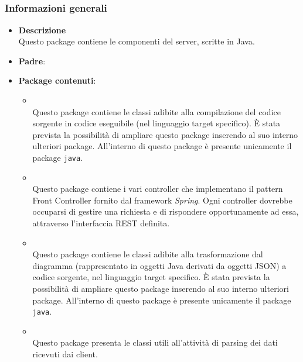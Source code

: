 \subsection{}
\label{\nogloxy{swedesigner::server}}
\subsubsection{Informazioni generali}
\begin{itemize}
\item \textbf{Descrizione}\\
Questo package contiene le componenti del server, scritte in Java.
\item \textbf{Padre}: \hyperref[\nogloxy{swedesigner}]{}
\item \textbf{Package contenuti}:
\begin{itemize}
\item \hyperref[\nogloxy{swedesigner::server::compiler}]{}\\
Questo package contiene le classi adibite alla compilazione del codice sorgente in codice eseguibile (nel linguaggio target specifico). È stata prevista la possibilità di ampliare questo package inserendo al suo interno ulteriori package. All'interno di questo package è presente unicamente il package \texttt{java}.
\item \hyperref[\nogloxy{swedesigner::server::controller}]{}\\
Questo package contiene i vari controller che implementano il pattern Front Controller fornito dal framework \emph{Spring}. Ogni controller dovrebbe occuparsi di gestire una richiesta e di rispondere opportunamente ad essa, attraverso l'interfaccia REST definita.
\item \hyperref[\nogloxy{swedesigner::server::generator}]{}\\
Questo package contiene le classi adibite alla trasformazione dal diagramma (rappresentato in oggetti Java derivati da oggetti JSON) a codice sorgente, nel linguaggio target specifico. È stata prevista la possibilità di ampliare questo package inserendo al suo interno ulteriori package. All'interno di questo package è presente unicamente il package \texttt{java}.
\item \hyperref[\nogloxy{swedesigner::server::parser}]{}\\
Questo package presenta le classi utili all'attività di parsing dei dati ricevuti dai client.

\end{itemize}
\end{itemize}
